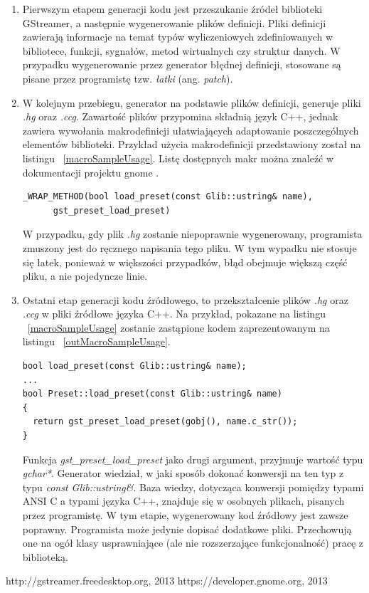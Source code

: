\documentclass[12pt]{article}
\begin{document}
\begin{enumerate}
 \setlength{\itemsep}{0em}
  \item Pierwszym etapem generacji kodu jest przeszukanie źródeł biblioteki GStreamer, a następnie wygenerowanie plików definicji. Pliki definicji zawierają informacje na temat typów wyliczeniowych zdefiniowanych w bibliotece, funkcji, sygnałów, metod wirtualnych czy struktur danych. W przypadku wygenerowanie przez generator błędnej definicji, stosowane są pisane przez programistę tzw. \textit{łatki} (ang. \textit{patch}).
  \item W kolejnym przebiegu, generator na podstawie plików definicji, generuje pliki \textit{.hg} oraz \textit{.ccg}. Zawartość plików przypomina składnią język C++, jednak zawiera wywołania makrodefinicji ułatwiających adaptowanie poszczególnych elementów biblioteki. Przykład użycia makrodefinicji przedstawiony został na listingu ~\ref{macroSampleUsage}.
Listę dostępnych makr można znaleźć w dokumentacji projektu gnome \cite{devgnomepage}.
    \begin{lstlisting}[caption=Przykład użycia makrodefinicji w pliku \textit{.hg}, label=macroSampleUsage]
_WRAP_METHOD(bool load_preset(const Glib::ustring& name), 
      gst_preset_load_preset)
    \end{lstlisting}
    W przypadku, gdy plik \textit{.hg} zostanie niepoprawnie wygenerowany, programista zmuszony jest do ręcznego napisania tego pliku. W tym wypadku nie stosuje się łatek, ponieważ w większości przypadków, błąd obejmuje większą część pliku, a nie pojedyncze linie.
  \item Ostatni etap generacji kodu źródłowego, to przekształcenie plików \textit{.hg} oraz \textit{.ccg} w pliki źródłowe języka C++. Na przykład, pokazane na listingu ~\ref{macroSampleUsage} zostanie zastąpione kodem zaprezentowanym na listingu ~\ref{outMacroSampleUsage}.
    \begin{lstlisting}[caption=Kod źródłowy wygenerowany na podstawie makrodefinicji, label=outMacroSampleUsage]
bool load_preset(const Glib::ustring& name);
...
bool Preset::load_preset(const Glib::ustring& name)
{
  return gst_preset_load_preset(gobj(), name.c_str());
}
    \end{lstlisting}
    Funkcja \textit{gst\_preset\_load\_preset} jako drugi argument, przyjmuje wartość typu \textit{gchar*}. Generator wiedział, w jaki sposób dokonać konwersji na ten typ z typu \textit{const Glib::ustring\&}. Baza wiedzy, dotycząca konwersji pomiędzy typami ANSI C a typami języka C++, znajduje się w osobnych plikach, pisanych przez programistę.
W tym etapie, wygenerowany kod źródłowy jest zawsze poprawny. Programista może jedynie dopisać dodatkowe pliki. Przechowują one na ogół klasy usprawniające (ale nie rozszerzające funkcjonalność) pracę z biblioteką.
\end{enumerate}

\cleardoublepage
\begin{thebibliography}{9}

  http://gstreamer.freedesktop.org, 2013
  https://developer.gnome.org, 2013

\end{thebibliography}
\end{document}
